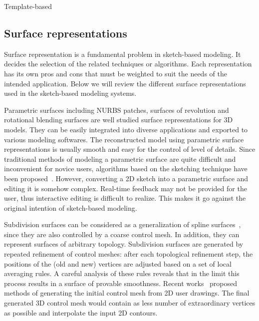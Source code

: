 Template-based





















\subsection{Surface representations}\label{ch2:sec:sbim:representation}

Surface representation is a fundamental problem in sketch-based modeling. It decides the selection of the related techniques or algorithms. Each representation has its own pros and cons that must be weighted to suit the needs of the intended application. Below we will review the different surface representations used in the sketch-based modeling systems.

Parametric surfaces including NURBS patches, surfaces of revolution and rotational blending surfaces are well studied surface representations for 3D models. They can be easily integrated into diverse applications and exported to various modeling softwares. The reconstructed model using parametric surface representations is usually smooth and easy for the control of level of details. Since traditional methods of modeling a parametric surface are quite difficult and inconvenient for novice users, algorithms based on the sketching technique have been proposed~\cite{EHBE97,CSSJ05,SWSJ06,BLP10}. However, converting a 2D sketch into a parametric surface and editing it is somehow complex. Real-time feedback may not be provided for the user, thus interactive editing is difficult to realize. This makes it go against the original intention of sketch-based modeling.

Subdivision surfaces can be considered as a generalization of spline surfaces~\cite{ZS00}, since they are also controlled by a coarse control mesh. In addition, they can represent surfaces of arbitrary topology. Subdivision surfaces are generated by repeated refinement of control meshes: after each topological refinement step, the positions of the (old and new) vertices are adjusted based on a set of local averaging rules. A careful analysis of these rules reveals that in the limit this process results in a surface of provable smoothness. Recent works~\cite{BHSF09,NKS09} proposed methods of generating the initial control mesh from 2D user drawings. The final generated 3D control mesh would contain as less number of extraordinary vertices as possible and interpolate the input 2D contours.

